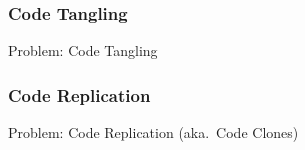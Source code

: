 \subsubsection{Code Tangling}
\begin{frame}{Problem: Code Tangling }
	\centering{}
\end{frame}

\subsubsection{Code Replication}
\begin{frame}{Problem: Code Replication (aka.\ Code Clones)}
	\centering{}
\end{frame}
